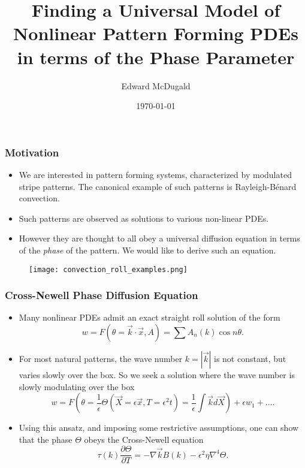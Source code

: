 \documentclass[]{beamer}
\title{Finding a Universal Model of Nonlinear Pattern Forming PDEs in terms of the Phase Parameter}
\author{Edward McDugald}
\institute{University of Arizona}
\date{\today}
\begin{document}
\begin{frame}
  \titlepage
\end{frame}

\begin{frame}
    \frametitle{Motivation}
    \begin{itemize}
        \item We are interested in pattern forming systems, characterized by modulated stripe patterns. The canonical example of such patterns is Rayleigh-B\'{e}nard convection.
        \item Such patterns are observed as solutions to various non-linear PDEs. 
        \item However they are thought to all obey a universal diffusion equation in terms of the \emph{phase} of the pattern. We would like to derive such an equation.
     \end{itemize}
        \begin{figure}
        \centering
        \texttt{[image: convection\_roll\_examples.png]}
        \end{figure}
\end{frame}

\begin{frame}
     \frametitle{Cross-Newell Phase Diffusion Equation}
     \begin{itemize}
 \item Many nonlinear PDEs admit an exact straight roll solution of the form
     \[
         w = F(\theta=\vec{k}\cdot\vec{x},A) = \sum A_n(k)\cos{n\theta}.
     \] 
 \item For most natural patterns, the wave number $k=|\vec{k}|$ is not constant, but varies slowly over the box. So we seek a solution where the wave number is slowly modulating over the box
     \[
         w = F(\theta = \frac{1}{\epsilon}\Theta(\vec{X}=\epsilon\vec{x},T=\epsilon^2 t) = \frac{1}{\epsilon}\int \vec{k}d\vec{X}) + \epsilon w_1 + \dots.
     \] 
\item Using this ansatz, and imposing some restrictive assumptions, one can show that the phase $\Theta$ obeys the Cross-Newell equation
    \[
        \tau(k)\frac{\partial \Theta}{\partial T} = -\nabla \vec{k}B(k) - \epsilon^2 \eta \nabla^4 \Theta.
    \] 
     \end{itemize}
\end{frame}
\end{document}

